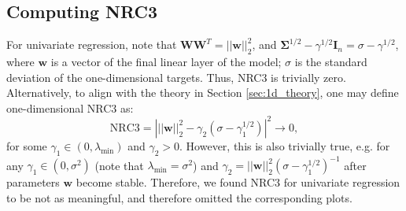 \documentclass{article}
\theoremstyle{plain}
\theoremstyle{definition}
\theoremstyle{remark}
\newcommand{\bW}{{\mathbf W}}
\newcommand{\bH}{{\mathbf H}}
\newcommand{\bI}{{\mathbf I}}
\newcommand{\bhi}{{\mathbf h}_i}
\newcommand{\bw}{{\mathbf w}}
\newcommand{\bSigma}{{\mathbf \Sigma}}
\begin{document}

% 





% 


\subsection{Computing NRC3}
\label{appendix: nrc3}
For univariate regression, note that $\bW\bW^T=||\bw||_2^2$, and $\bSigma^{1/2} - \gamma^{1/2} \bI_n = \sigma - \gamma^{1/2}$, where $\bw$ is a vector of the final linear layer of the model; $\sigma$ is the standard deviation of the one-dimensional targets. Thus, NRC3 is trivially zero. Alternatively, to align with the theory in Section \ref{sec:1d_theory}, one may define one-dimensional NRC3 as:
\[
\text{NRC3} = \left|||\bw||_2^2 - \gamma_2(\sigma - \gamma_1^{1/2}) \right|^2 \to 0,
\]
for some $\gamma_1 \in (0, \lambda_{\min})$ and $\gamma_2 > 0$. However, this is also trivially true, e.g. for any $\gamma_1 \in (0, \sigma^2)$ (note that $\lambda_{\min}=\sigma^2$) and $\gamma_2 = ||\bw||_2^2(\sigma - \gamma_1^{1/2})^{-1}$ after parameters $\bw$ become stable. Therefore, we found NRC3 for univariate regression to be not as meaningful, and therefore omitted the corresponding plots.
\end{document}
